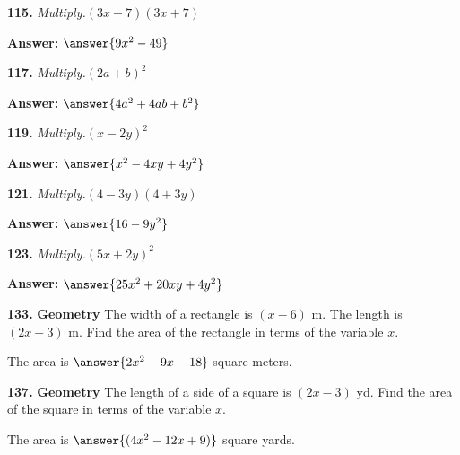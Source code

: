 \documentclass{ximera}
\begin{document}
\begin{problem}
\textbf{115.} \emph{Multiply.}\quad $(3x - 7)(3x + 7)$

\textbf{Answer:} $\answer{9x^2 -49}$
\end{problem}

\begin{problem}
\textbf{117.} \emph{Multiply.}\quad $(2a + b)^2$

\textbf{Answer:} $\answer{4a^2 +4ab +b^2}$
\end{problem}

\begin{problem}
\textbf{119.} \emph{Multiply.}\quad $(x - 2y)^2$

\textbf{Answer:} $\answer{x^2 -4xy +4y^2}$
\end{problem}

\begin{problem}
\textbf{121.} \emph{Multiply.}\quad $(4 - 3y)(4 + 3y)$

\textbf{Answer:} $\answer{16 -9y^2}$
\end{problem}

\begin{problem}
\textbf{123.} \emph{Multiply.}\quad $(5x + 2y)^2$

\textbf{Answer:} $\answer{25x^2 +20xy +4y^2}$
\end{problem}

\begin{problem}
\textbf{133.} \textbf{Geometry} The width of a rectangle is $(x - 6)$ m. The length is
  $(2x + 3)$ m. Find the area of the rectangle in terms of the variable $x$.

The area is $\answer{2x^2 -9x -18}$ square meters.
\end{problem}

\begin{problem}
\textbf{137.} \textbf{Geometry} The length of a side of a square is $(2x - 3)$ yd. Find the
  area of the square in terms of the variable $x$.

The area is $\answer{(4x^2 -12x +9)}$ square yards.
\end{problem}
\end{document}
